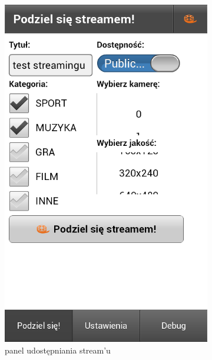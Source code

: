 \begin{figure}[h]
        \centering
        \begin{subfigure}[b]{0.3\textwidth}
                \centering
                \includegraphics[width=\textwidth]{img/screens/mobile_broadcaster/panel-udostepniania-streamu.png}
                \caption{panel udostępniania stream'u}
        \end{subfigure}%
        ~ %
        \begin{subfigure}[b]{0.3\textwidth}

\end{subfigure}
\end{figure}
